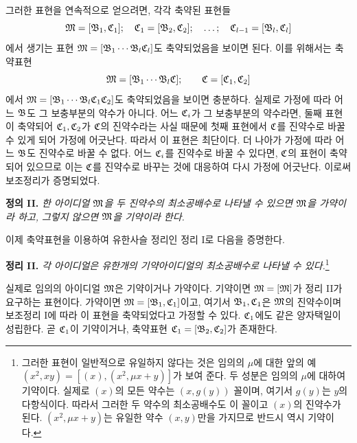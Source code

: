 그러한 표현을 연속적으로 얻으려면, 각각 축약된 표현들
\[
 \mathfrak{M}=[\mathfrak{B}_1,\mathfrak{C}_1];\quad
 \mathfrak{C}_1=[\mathfrak{B}_2,\mathfrak{C}_2];\quad\ldots;\quad
 \mathfrak{C}_{l-1}=[\mathfrak{B}_l,\mathfrak{C}_l]
\]
에서 생기는 표현 $\mathfrak{M}=[\mathfrak{B}_1\cdots\mathfrak{B}_l\mathfrak{C}_l]$도 축약되었음을 보이면 된다. 이를 위해서는 축약표현
\[
 \mathfrak{M}=[\mathfrak{B}_1\cdots\mathfrak{B}_l\mathfrak{C}];\qquad
 \mathfrak{C}=[\mathfrak{C}_1,\mathfrak{C}_2]
\]
에서 $\mathfrak{M}=[\mathfrak{B}_1\cdots\mathfrak{B}_l\mathfrak{C}_1\mathfrak{C}_2]$도 축약되었음을 보이면 충분하다. 실제로 가정에 따라 어느 $\mathfrak{B}$도 그 보충부분의 약수가 아니다. 어느 $\mathfrak{C}_i$가 그 보충부분의 약수라면, 둘째 표현이 축약되어 $\mathfrak{C}_1,\mathfrak{C}_2$가 $\mathfrak{C}$의 진약수라는 사실 때문에 첫째 표현에서 $\mathfrak{C}$를 진약수로 바꿀 수 있게 되어 가정에 어긋난다. 따라서 이 표현은 최단이다. 더 나아가 가정에 따라 어느 $\mathfrak{B}$도 진약수로 바꿀 수 없다. 어느 $\mathfrak{C}_i$를 진약수로 바꿀 수 있다면, $\mathfrak{C}$의 표현이 축약되어 있으므로 이는 $\mathfrak{C}$를 진약수로 바꾸는 것에 대응하여 다시 가정에 어긋난다. 이로써 보조정리가 증명되었다.

\textbf{정의 II.} \emph{한 아이디얼 $\mathfrak{M}$을 두 진약수의 최소공배수로 나타낼 수 있으면 $\mathfrak{M}$을 가약이라 하고, 그렇지 않으면 $\mathfrak{M}$을 기약이라 한다.}

이제 축약표현을 이용하여 유한사슬 정리인 정리 I로 다음을 증명한다.

\textbf{정리 II.} \emph{각 아이디얼은 유한개의 기약아이디얼의 최소공배수로 나타낼 수 있다.}\footnote{그러한 표현이 일반적으로 유일하지 않다는 것은 임의의 $\mu$에 대한 앞의 예 $(x^2,xy)=[(x),(x^2,\mu x+y)]$가 보여 준다. 두 성분은 임의의 $\mu$에 대하여 기약이다. 실제로 $(x)$의 모든 약수는 $(x,g(y))$ 꼴이며, 여기서 $g(y)$는 $y$의 다항식이다. 따라서 그러한 두 약수의 최소공배수도 이 꼴이고 $(x)$의 진약수가 된다. $(x^2,\mu x+y)$는 유일한 약수 $(x,y)$만을 가지므로 반드시 역시 기약이다.}

실제로 임의의 아이디얼 $\mathfrak{M}$은 기약이거나 가약이다. 기약이면 $\mathfrak{M}=[\mathfrak{M}]$가 정리 II가 요구하는 표현이다. 가약이면 $\mathfrak{M}=[\mathfrak{B}_1,\mathfrak{C}_1]$이고, 여기서 $\mathfrak{B}_1,\mathfrak{C}_1$은 $\mathfrak{M}$의 진약수이며 보조정리 I에 따라 이 표현을 축약되었다고 가정할 수 있다. $\mathfrak{C}_1$에도 같은 양자택일이 성립한다. 곧 $\mathfrak{C}_1$이 기약이거나, 축약표현 $\mathfrak{C}_1=[\mathfrak{B}_2,\mathfrak{C}_2]$가 존재한다.


